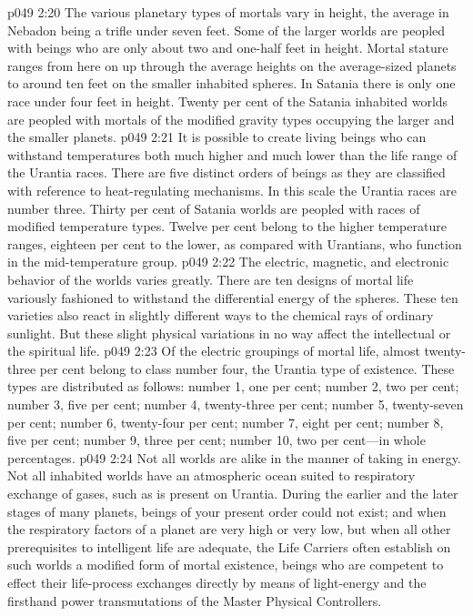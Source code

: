 \vs p049 2:20 The various planetary types of mortals vary in height, the average in Nebadon being a trifle under seven feet. Some of the larger worlds are peopled with beings who are only about two and one\hyp{}half feet in height. Mortal stature ranges from here on up through the average heights on the average\hyp{}sized planets to around ten feet on the smaller inhabited spheres. In Satania there is only one race under four feet in height. Twenty per cent of the Satania inhabited worlds are peopled with mortals of the modified gravity types occupying the larger and the smaller planets.
\pc \vs p049 2:21 \bibnobreakspace {} It is possible to create living beings who can withstand temperatures both much higher and much lower than the life range of the Urantia races. There are five distinct orders of beings as they are classified with reference to heat\hyp{}regulating mechanisms. In this scale the Urantia races are number three. Thirty per cent of Satania worlds are peopled with races of modified temperature types. Twelve per cent belong to the higher temperature ranges, eighteen per cent to the lower, as compared with Urantians, who function in the mid\hyp{}temperature group.
\pc \vs p049 2:22 \bibnobreakspace {} The electric, magnetic, and electronic behavior of the worlds varies greatly. There are ten designs of mortal life variously fashioned to withstand the differential energy of the spheres. These ten varieties also react in slightly different ways to the chemical rays of ordinary sunlight. But these slight physical variations in no way affect the intellectual or the spiritual life.
\vs p049 2:23 Of the electric groupings of mortal life, almost twenty\hyp{}three per cent belong to class number four, the Urantia type of existence. These types are distributed as follows: number 1, one per cent; number 2, two per cent; number 3, five per cent; number 4, twenty\hyp{}three per cent; number 5, twenty\hyp{}seven per cent; number 6, twenty\hyp{}four per cent; number 7, eight per cent; number 8, five per cent; number 9, three per cent; number 10, two per cent---in whole percentages.
\pc \vs p049 2:24 \bibnobreakspace {} Not all worlds are alike in the manner of taking in energy. Not all inhabited worlds have an atmospheric ocean suited to respiratory exchange of gases, such as is present on Urantia. During the earlier and the later stages of many planets, beings of your present order could not exist; and when the respiratory factors of a planet are very high or very low, but when all other prerequisites to intelligent life are adequate, the Life Carriers often establish on such worlds a modified form of mortal existence, beings who are competent to effect their life\hyp{}process exchanges directly by means of light\hyp{}energy and the firsthand power transmutations of the Master Physical Controllers.
